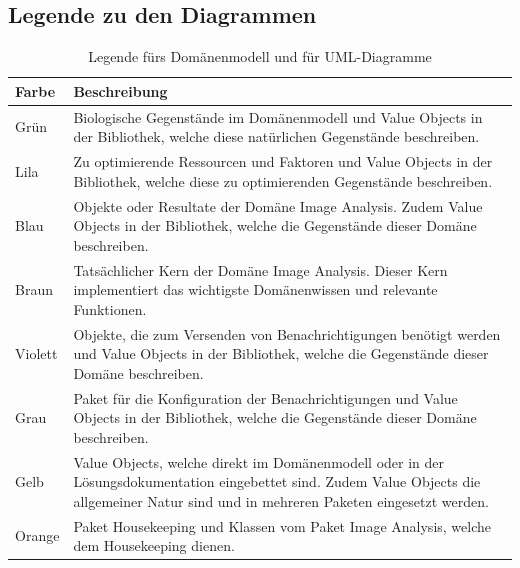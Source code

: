 \subsection{Legende zu den Diagrammen}
\begin{table}[H]
	\centering	
	
	\begin{tabular}{ p{2cm}  p{12cm}  }
		
		\toprule[1pt]
		\rowcolor{maroon!30}	
		Farbe & Beschreibung \\
		
		\midrule
Grün \cellcolor[RGB]{204,235,197}&  Biologische Gegenstände im Domänenmodell und Value Objects in der Bibliothek, welche diese natürlichen Gegenstände beschreiben. \\
Lila \cellcolor[RGB]{253,218,236} & Zu optimierende Ressourcen und Faktoren und Value Objects in der Bibliothek,  welche diese zu optimierenden Gegenstände beschreiben.\\
Blau\cellcolor[RGB]{179,205,227} &  Objekte oder Resultate der Domäne \glqq{}Image Analysis\grqq{}. Zudem Value Objects in der Bibliothek, welche die Gegenstände dieser Domäne beschreiben. \\
Braun \cellcolor[RGB]{229,216,189}& Tatsächlicher Kern der Domäne \glqq{}Image Analysis\grqq{}. Dieser Kern implementiert das wichtigste Domänenwissen und relevante Funktionen.\\			
Violett \cellcolor[RGB]{222,203,228} & Objekte, die zum Versenden von Benachrichtigungen benötigt werden und Value Objects in der Bibliothek, welche die Gegenstände dieser Domäne beschreiben.\\
Grau\cellcolor[RGB]{242,242,242} &  Paket für die Konfiguration der Benachrichtigungen und Value Objects in der Bibliothek, welche die Gegenstände dieser Domäne beschreiben.\\		
Gelb \cellcolor[RGB]{255,255,204}& Value Objects, welche direkt im Domänenmodell oder in der Lösungsdokumentation eingebettet sind. Zudem Value Objects die allgemeiner Natur sind und in mehreren Paketen eingesetzt werden. \\		
Orange \cellcolor[RGB]{254,217,166} &  Paket \glqq{}Housekeeping\grqq{} und Klassen vom Paket \glqq{}Image Analysis\grqq{}, welche dem Housekeeping dienen. \\
		
		\bottomrule
		
	\end{tabular}
	\caption{Legende fürs Domänenmodell und für UML-Diagramme}
	\label{tab: Legende fürs Domänenmodell und für die UML-Diagramme als Lösungsdokumentation}
\end{table}


